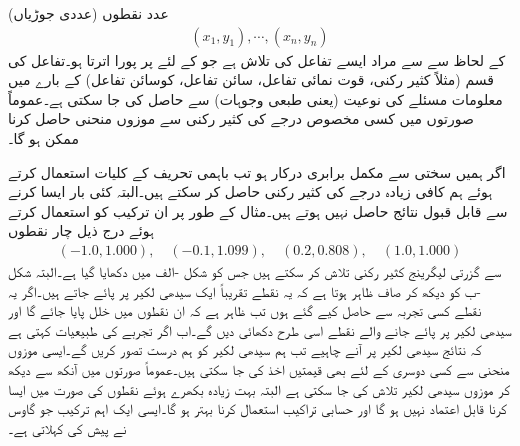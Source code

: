  عدد نقطوں (عددی جوڑیاں)
\begin{align*}
(x_1,y_1),\cdots,(x_n,y_n)
\end{align*}
کے لحاظ سے  سے مراد ایسے تفاعل  کی تلاش ہے  جو   کے لئے  پر پورا اترتا ہو۔تفاعل کی قسم (مثلاً کثیر رکنی، قوت نمائی تفاعل، سائن تفاعل، کوسائن تفاعل) کے بارے میں معلومات مسئلے کی نوعیت (یعنی طبعی وجوہات) سے حاصل کی جا سکتی ہے۔عموماً صورتوں میں کسی مخصوص درجے کی کثیر رکنی سے  موزوں منحنی حاصل کرنا ممکن ہو گا۔

 اگر ہمیں  سختی سے  مکمل برابری   درکار ہو تب باہمی تحریف کے کلیات استعمال کرتے ہوئے  ہم کافی زیادہ درجے کی کثیر رکنی  حاصل کر سکتے ہیں۔البتہ کئی بار ایسا کرنے سے  قابل قبول نتائج حاصل نہیں ہوتے ہیں۔مثال کے طور پر ان ترکیب کو استعمال کرتے ہوئے درج ذیل چار نقطوں
\begin{align}\label{مساوات_خطی_اعدادی_کمتر_مربع_شرائط_الف}
(-1.0,1.000),\quad (-0.1,1.099),\quad (0.2,0.808),\quad (1.0,1.000)
\end{align}
سے گزرتی لیگرینج کثیر رکنی  تلاش کر سکتے ہیں جس کو شکل -الف میں دکھایا گیا ہے۔البتہ شکل -ب کو دیکھ کر صاف ظاہر ہوتا ہے کہ یہ نقطے تقریباً ایک سیدھی لکیر پر پائے جاتے ہیں۔اگر یہ نقطے کسی تجربہ سے حاصل کیے گئے ہوں تب ظاہر ہے کہ ان نقطوں میں خلل پایا جائے گا اور سیدھی لکیر پر پائے جانے والے نقطے اسی طرح دکھائی دیں گے۔اب اگر تجربے کی طبیعیات کہتی ہے کہ نتائج سیدھی لکیر پر آنے چاہیے تب ہم سیدھی لکیر کو ہم درست تصور کریں گے۔ایسی موزوں منحنی سے کسی دوسری  کے لئے بھی قیمتیں اخذ کی جا سکتی ہیں۔عموماً صورتوں میں آنکھ سے دیکھ کر موزوں سیدھی لکیر تلاش کی جا سکتی ہے البتہ بہت زیادہ بکھرے  ہوئے نقطوں کی صورت میں ایسا کرنا قابل اعتماد نہیں ہو گا اور حسابی تراکیب استعمال کرنا بہتر ہو گا۔ایسی ایک اہم ترکیب جو گاوس نے پیش کی   کہلاتی ہے۔
